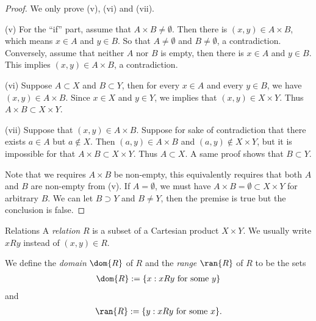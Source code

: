 \begin{proof}
    We only prove (v), (vi) and (vii).

    (v) For the ``if'' part, assume that $A \times B \neq \emptyset$. Then there is $(x, y) \in A \times B$, which means $x \in A$ and $y \in B$. So that $A \neq \emptyset$ and $B \neq \emptyset$, a contradiction. Conversely, assume that neither $A$ nor $B$ is empty, then there is $x \in A$ and $y \in B$. This implies $(x, y) \in A \times B$, a contradiction.

    (vi) Suppose $A \subset X$ and $B \subset Y$, then for every $x \in A$ and every $y \in B$, we have $(x, y) \in A \times B$. Since $x \in X$ and $y \in Y$, we implies that $(x, y) \in X \times Y$. Thus $A \times B \subset X \times Y$.

    (vii) Suppose that $(x, y) \in A \times B$. Suppose for sake of contradiction that there exists $a \in A$ but $a \notin X$. Then $(a, y) \in A \times B$ and $(a, y) \notin X \times Y$, but it is impossible for that $A \times B \subset X \times Y$. Thus $A \subset X$. A same proof shows that $B \subset Y$.

    Note that we requires $A \times B$ be non-empty, this equivalently requires that both $A$ and $B$ are non-empty from (v). If $A = \emptyset$, we must have $A \times B = \emptyset \subset X \times Y$ for arbitrary $B$. We can let $B \supset Y$ and $B \neq Y$, then the premise is true but the conclusion is false.
\end{proof}

\begin{definition}{Relations}
    A \emph{relation} $R$ is a subset of a Cartesian product $X \times Y$. We usually write $x R y$ instead of $(x, y) \in R$.

    We define the \emph{domain} $\dom{R}$ of $R$ and the \emph{range} $\ran{R}$ of $R$ to be the sets
    \begin{align*}
        \dom{R} := \{x : x R y \text{ for some } y\}
    \end{align*}
    and
    \begin{align*}
        \ran{R} := \{y : x R y \text{ for some } x\}.
    \end{align*}
\end{definition}



